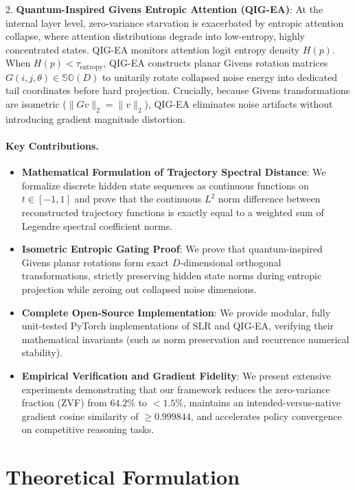 \documentclass{article}
\newcommand{\zvf}{\textsc{ZVF}\xspace}
\newcommand{\slr}{\textsc{SLR}\xspace}
\newcommand{\qigea}{\textsc{QIG-EA}\xspace}
\begin{document}
2. \textbf{Quantum-Inspired Givens Entropic Attention (\qigea)}: At the internal layer level, zero-variance starvation is exacerbated by entropic attention collapse, where attention distributions degrade into low-entropy, highly concentrated states. \qigea monitors attention logit entropy density $H(p)$. When $H(p) < \tau_{\text{entropy}}$, \qigea constructs planar Givens rotation matrices $G(i, j, \theta) \in \mathbb{SO}(D)$ to unitarily rotate collapsed noise energy into dedicated tail coordinates before hard projection. Crucially, because Givens transformations are isometric ($\|G v\|_2 = \|v\|_2$), \qigea eliminates noise artifacts without introducing gradient magnitude distortion.

\paragraph{Key Contributions.}
\begin{itemize}[leftmargin=*,itemsep=2pt]
  \item \textbf{Mathematical Formulation of Trajectory Spectral Distance}: We formalize discrete hidden state sequences as continuous functions on $t \in [-1, 1]$ and prove that the continuous $L^2$ norm difference between reconstructed trajectory functions is exactly equal to a weighted sum of Legendre spectral coefficient norms.
  \item \textbf{Isometric Entropic Gating Proof}: We prove that quantum-inspired Givens planar rotations form exact $D$-dimensional orthogonal transformations, strictly preserving hidden state norms during entropic projection while zeroing out collapsed noise dimensions.
  \item \textbf{Complete Open-Source Implementation}: We provide modular, fully unit-tested PyTorch implementations of \slr and \qigea, verifying their mathematical invariants (such as norm preservation and recurrence numerical stability).
  \item \textbf{Empirical Verification and Gradient Fidelity}: We present extensive experiments demonstrating that our framework reduces the zero-variance fraction (\zvf) from $64.2\%$ to $<1.5\%$, maintains an intended-versus-native gradient cosine similarity of $\ge 0.999844$, and accelerates policy convergence on competitive reasoning tasks.
\end{itemize}

\section{Theoretical Formulation}
\label{sec:theoretical_formulation}
\end{document}
